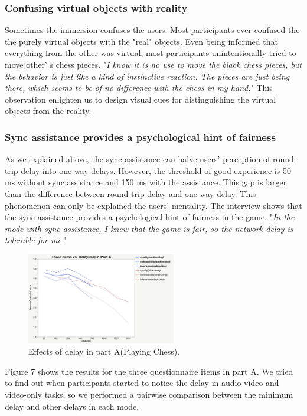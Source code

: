 \subsubsection{Confusing virtual objects with reality}

Sometimes the immersion confuses the users. Most participants ever confused the the purely virtual objects with the "real" objects. Even being informed that everything from the other was virtual, most participants unintentionally tried to move other' s chess pieces. "\emph{I know it is no use to move the black chess pieces, but the behavior is just like a kind of instinctive reaction. The pieces are just being there, which seems to be of no difference with the chess in my hand.}" This observation enlighten us to design visual cues for distinguishing the virtual objects from the reality.

\subsubsection{Sync assistance provides a psychological hint of fairness}

As we explained above, the sync assistance can halve users' perception of round-trip delay into one-way delays. However, the threshold of good experience is 50 ms without sync assistance and 150 ms with the assistance. This gap is larger than the difference between round-trip delay and one-way delay. This phenomenon can only be explained the users' mentality. The interview shows that the sync assistance provides a psychological hint of fairness in the game. "\emph{In the mode with sync assistance, I knew that the game is fair, so the network delay is tolerable for me.}"

\iffalse

\begin{figure}[!htbp]
\centering
\includegraphics[width=6.5cm]{figures/figure_experiment1.jpg}
\setlength{\abovecaptionskip}{0.5cm}
\caption{Effects of delay in part A(Playing Chess).}
\label{4}
\end{figure}

Figure 7 shows the results for the three questionnaire items in part A. We tried to find out when participants started to notice the delay in audio-video and video-only tasks, so we performed a pairwise comparison between the minimum delay and other delays in each mode.

